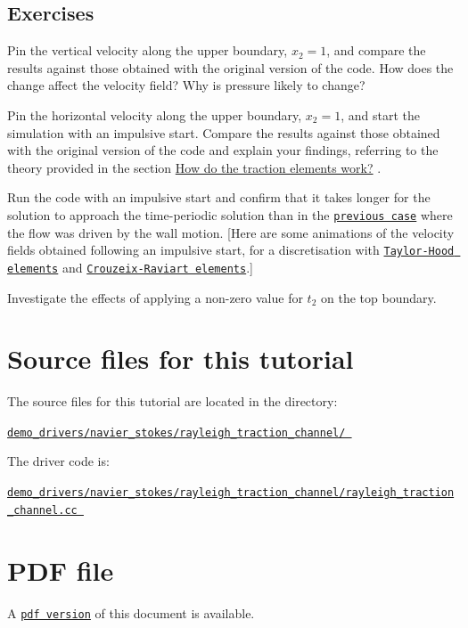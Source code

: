 \hypertarget{index_ex}{}\subsection{Exercises}\label{index_ex}

\begin{DoxyEnumerate}
\item Pin the vertical velocity along the upper boundary, $ x_2 = 1$, and compare the results against those obtained with the original version of the code. How does the change affect the velocity field? Why is pressure likely to change?
\item Pin the horizontal velocity along the upper boundary, $ x_2 = 1$, and start the simulation with an impulsive start. Compare the results against those obtained with the original version of the code and explain your findings, referring to the theory provided in the section \hyperlink{index_traction_theory}{How do the traction elements work?} .
\item Run the code with an impulsive start and confirm that it takes longer for the solution to approach the time-\/periodic solution than in the \href{../../rayleigh_channel/html/index.html}{\tt previous case} where the flow was driven by the wall motion. \mbox{[}Here are some animations of the velocity fields obtained following an impulsive start, for a discretisation with \href{../figures/velocity_vectors_TH.avi}{\tt Taylor-\/\+Hood elements} and \href{../figures/velocity_vectors_CR.avi}{\tt Crouzeix-\/\+Raviart elements}.\mbox{]}
\item Investigate the effects of applying a non-\/zero value for $ t_2 $ on the top boundary.
\end{DoxyEnumerate}



 

\hypertarget{index_sources}{}\section{Source files for this tutorial}\label{index_sources}

\begin{DoxyItemize}
\item The source files for this tutorial are located in the directory\+: \begin{center} \href{../../../../demo_drivers/navier_stokes/rayleigh_traction_channel/}{\tt demo\+\_\+drivers/navier\+\_\+stokes/rayleigh\+\_\+traction\+\_\+channel/ } \end{center} 
\item The driver code is\+: \begin{center} \href{../../../../demo_drivers/navier_stokes/rayleigh_traction_channel/rayleigh_traction_channel.cc}{\tt demo\+\_\+drivers/navier\+\_\+stokes/rayleigh\+\_\+traction\+\_\+channel/rayleigh\+\_\+traction\+\_\+channel.\+cc } \end{center} 
\end{DoxyItemize}



 

 \hypertarget{index_pdf}{}\section{P\+D\+F file}\label{index_pdf}
A \href{../latex/refman.pdf}{\tt pdf version} of this document is available. 
